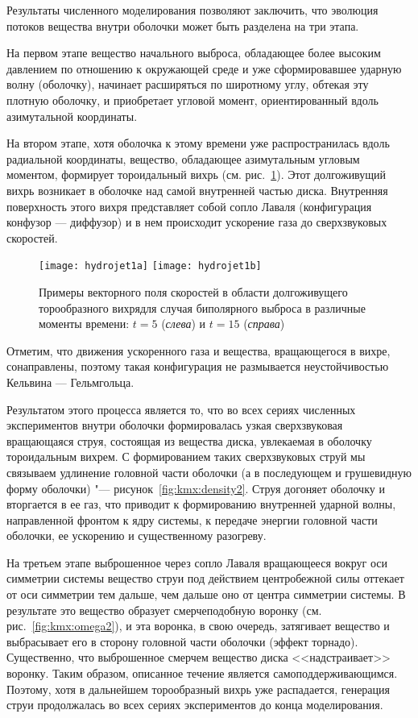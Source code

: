 Результаты численного моделирования позволяют заключить, что
эволюция потоков вещества внутри оболочки может быть разделена
на три этапа.

На первом этапе вещество начального выброса, обладающее
более высоким давлением по отношению к окружающей среде и уже
сформировавшее ударную волну (оболочку), начинает расширяться по
широтному углу, обтекая эту плотную оболочку, и приобретает
угловой момент, ориентированный вдоль азимутальной координаты.

На втором этапе, хотя оболочка к этому времени уже
распространилась вдоль радиальной координаты, вещество, обладающее
азимутальным угловым моментом, формирует тороидальный вихрь
(см. рис.~\ref{fig:kmx:vectors}). Этот долгоживущий вихрь возникает в оболочке
над самой внутренней частью диска. Внутренняя поверхность этого
вихря представляет собой сопло Лаваля (конфигурация
конфузор --- диффузор) и в нем происходит ускорение газа до
сверхзвуковых скоростей.

\begin{figure}[!htb]
\centering
\texttt{[image: hydrojet1a]}
\texttt{[image: hydrojet1b]}
\caption{Примеры векторного поля скоростей в области долгоживущего торообразного вихря\plb для случая биполярного выброса в различные моменты времени: ${t = 5}$ (\emph{слева}) и ${t = 15}$ (\emph{справа})}
\label{fig:kmx:vectors}\vspace*{5mm}
\end{figure}

Отметим, что движения ускоренного газа и вещества, вращающегося
в вихре, сонаправлены, поэтому такая конфигурация не размывается
неустойчивостью Кельвина --- Гельмгольца.

Результатом этого процесса является то, что во всех сериях
численных экспериментов внутри оболочки формировалась узкая
сверхзвуковая вращающаяся струя, состоящая из вещества диска,
увлекаемая в оболочку тороидальным вихрем. С формированием таких
сверхзвуковых струй мы связываем удлинение головной части оболочки
(а в последующем и грушевидную форму оболочки) "---
рисунок~\ref{fig:kmx:density2}. Струя догоняет оболочку и вторгается в ее газ,
что приводит к формированию внутренней ударной волны, направленной
фронтом к ядру системы, к передаче энергии головной части оболочки,
ее ускорению и существенному разогреву.

На третьем этапе выброшенное через сопло Лаваля
вращающееся вокруг оси симметрии системы вещество струи под
действием центробежной силы оттекает от оси симметрии тем дальше,
чем дальше оно от центра симметрии системы. В результате это вещество
образует смерчеподобную воронку (см. рис.~\ref{fig:kmx:omega2}), и эта воронка,
в свою очередь, затягивает вещество и выбрасывает его в сторону
головной части оболочки (эффект торнадо). Существенно, что выброшенное
смерчем вещество диска <<надстраивает>> воронку. Таким образом, описанное
течение является самоподдерживающимся. Поэтому, хотя в дальнейшем
торообразный вихрь уже распадается, генерация струи продолжалась
во всех сериях экспериментов до конца моделирования.



